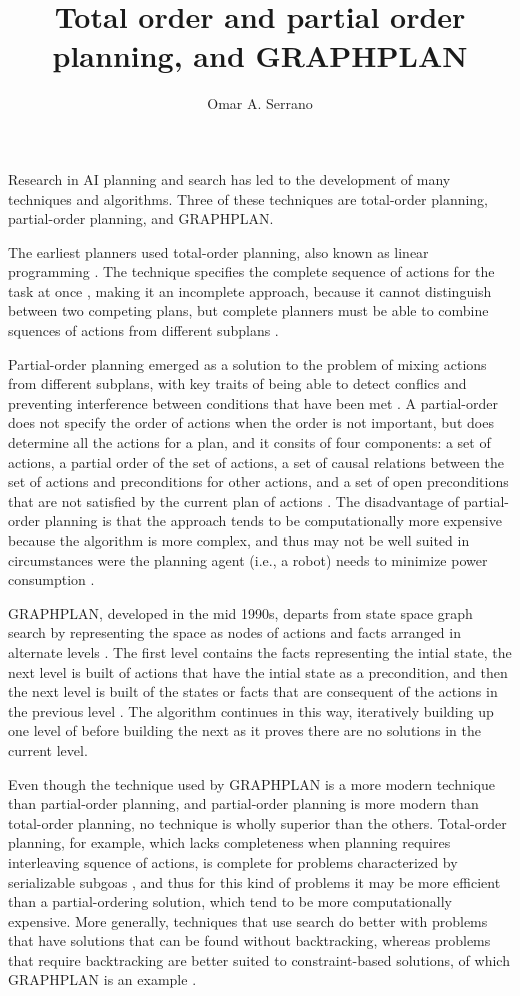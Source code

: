 \documentclass[10pt,a4paper]{article}
\title{Total order and partial order planning, and GRAPHPLAN}
\author{Omar A. Serrano}
\begin{document}
\maketitle

Research in AI planning and search has led to the development of many techniques
and algorithms. Three of these techniques are total-order planning,
partial-order planning, and GRAPHPLAN.

The earliest planners used total-order planning, also known as linear
programming \cite{1}. The technique specifies the complete sequence of actions
for the task at once \cite{2}, making it an incomplete approach, because it
cannot distinguish between two competing plans, but complete planners must be
able to combine squences of actions from different subplans \cite{1}.

Partial-order planning emerged as a solution to the problem of mixing actions
from different subplans, with key traits of being able to detect conflics and
preventing interference between conditions that have been met \cite{1}. A
partial-order does not specify the order of actions when the order is not
important, but does determine all the actions for a plan, and it consits of four
components: a set of actions, a partial order of the set of actions, a set of
causal relations between the set of actions and preconditions for other actions,
and a set of open preconditions that are not satisfied by the current plan of
actions \cite{2}. The disadvantage of partial-order planning is that the
approach tends to be computationally more expensive because the algorithm is
more complex, and thus may not be well suited in circumstances were the planning
agent (i.e., a robot) needs to minimize power consumption \cite{2}.

GRAPHPLAN, developed in the mid 1990s, departs from state space graph search by
representing the space as nodes of actions and facts arranged in alternate
levels \cite{3}. The first level contains the facts representing the intial
state, the next level is built of actions that have the intial state as a
precondition, and then the next level is built of the states or facts that are
consequent of the actions in the previous level \cite{3}. The algorithm
continues in this way, iteratively building up one level of before building the
next as it proves there are no solutions in the current level.

Even though the technique used by GRAPHPLAN is a more modern technique than
partial-order planning, and partial-order planning is more modern than
total-order planning, no technique is wholly superior than the others.
Total-order planning, for example, which lacks completeness when planning
requires interleaving squence of actions, is complete for problems characterized
by serializable subgoas \cite{1}, and thus for this kind of problems it may be
more efficient than a partial-ordering solution, which tend to be more
computationally expensive. More generally, techniques that use search do better
with problems that have solutions that can be found without backtracking,
whereas problems that require backtracking are better suited to constraint-based
solutions, of which GRAPHPLAN is an example \cite{1}.
\end{document}
